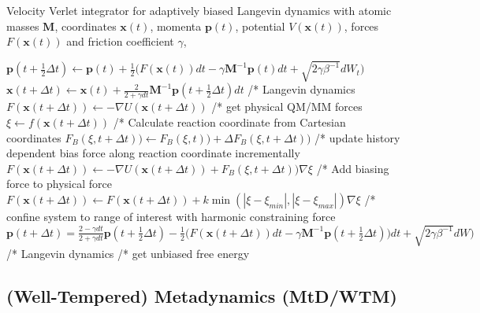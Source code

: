 \begin{algorithm}[H]
  \caption{Velocity Verlet integrator for adaptively biased Langevin dynamics with atomic masses $\textbf{M}$, coordinates $\textbf{x}(t)$, momenta $\textbf{p}(t)$, potential $V(\textbf{x}(t))$, forces $F(\textbf{x}(t))$ and friction coefficient $\gamma$,}
  \label{alg:ABM}
    \begin{algorithmic}
        \STATE
        \STATE $\textbf{p}(t+\frac{1}{2}\Delta t) \leftarrow \textbf{p}(t) + \frac{1}{2} \bigl(F(\textbf{x}(t))dt-\gamma \textbf{M}^{-1}\textbf{p}(t) dt + \sqrt{2\gamma\beta^{-1}}dW_t \bigr)$
        \STATE $\textbf{x}(t+\Delta t) \leftarrow \textbf{x}(t) + \frac{2}{2+\gamma dt}\textbf{M}^{-1} \textbf{p}(t+\frac{1}{2}\Delta t) dt$
        \STATE /* Langevin dynamics
        \STATE
        \STATE $F(\textbf{x}(t+\Delta t)) \leftarrow -\nabla U(\textbf{x}(t+\Delta t))$
        \STATE /* get physical QM/MM forces
        \STATE
        \STATE $\xi \leftarrow f(\textbf{x}(t+\Delta t))$
        \STATE /* Calculate reaction coordinate from Cartesian coordinates
        \STATE
          \STATE
          \STATE $F_{B}(\xi, t+\Delta t))\leftarrow F_{B}(\xi, t))+\Delta F_{B}(\xi,t+\Delta t))$
          \STATE /* update history dependent bias force along reaction coordinate incrementally
          \STATE
          \STATE $F(\textbf{x}(t+\Delta t)) \leftarrow -\nabla U(\textbf{x}(t+\Delta t)) + F_{B}(\xi, t+\Delta t))\nabla\xi$
          \STATE /* Add biasing force to physical force
          \STATE
        \ELSE
          \STATE
          \STATE $F(\textbf{x}(t+\Delta t)) \leftarrow F(\textbf{x}(t+\Delta t)) + k\min(|\xi-\xi_{min}|,|\xi-\xi_{max}|)\nabla\xi$
          \STATE /* confine system to range of interest with harmonic constraining force
          \STATE
        \ENDIF
        \STATE
        \STATE $\textbf{p}(t+\Delta t) = \frac{2 - \gamma dt}{2+\gamma dt} \textbf{p}(t+\frac{1}{2}\Delta t) - \frac{1}{2} \bigl(F(\textbf{x}(t+\Delta t))dt-\gamma \textbf{M}^{-1}\textbf{p}(t+\frac{1}{2}\Delta t)) dt + \sqrt{2\gamma\beta^{-1}}dW\bigr)$
        \STATE /* Langevin dynamics
        \STATE
      \ENDWHILE
      \STATE /* get unbiased free energy
    \end{algorithmic}
\end{algorithm}

\newpage
\subsection{(Well-Tempered) Metadynamics (MtD/WTM)}
\label{sec:metaD}

